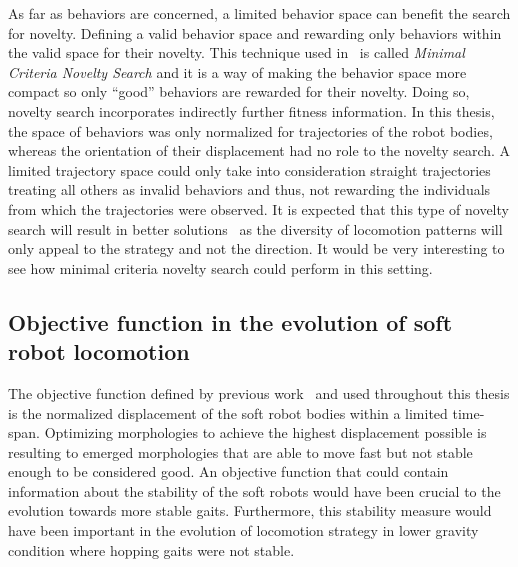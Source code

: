 As far as behaviors are concerned, a limited behavior space can benefit the search for novelty. Defining a valid behavior space and rewarding only behaviors within the valid space for their novelty. This technique used in~\citep{lehman2011abandoning} is called \emph{Minimal Criteria Novelty Search} and it is a way of making the behavior space more compact so only ``good'' behaviors are rewarded for their novelty. Doing so, novelty search incorporates indirectly further fitness information. In this thesis, the space of behaviors was only normalized for trajectories of the robot bodies, whereas the orientation of their displacement had no role to the novelty search. A limited trajectory space could only take into consideration straight trajectories treating all others as invalid behaviors and thus, not rewarding the individuals from which the trajectories were observed. It is expected that this type of novelty search will result in better solutions~\citep{lehman2011abandoning} as the diversity of locomotion patterns will only appeal to the strategy and not the direction. It would be very interesting to see how minimal criteria novelty search could perform in this setting.

\subsection*{Objective function in the evolution of soft robot locomotion}

The objective function defined by previous work~\citep{cheney2013unshackling} and used throughout this thesis is the normalized displacement of the soft robot bodies within a limited time-span. Optimizing morphologies to achieve the highest displacement possible is resulting to emerged morphologies that are able to move fast but not stable enough to be considered good. An objective function that  could contain information about the stability of the soft robots would have been crucial to the evolution towards more stable gaits. Furthermore, this stability measure would have been important in the evolution of locomotion strategy in lower gravity condition where hopping gaits were not stable.